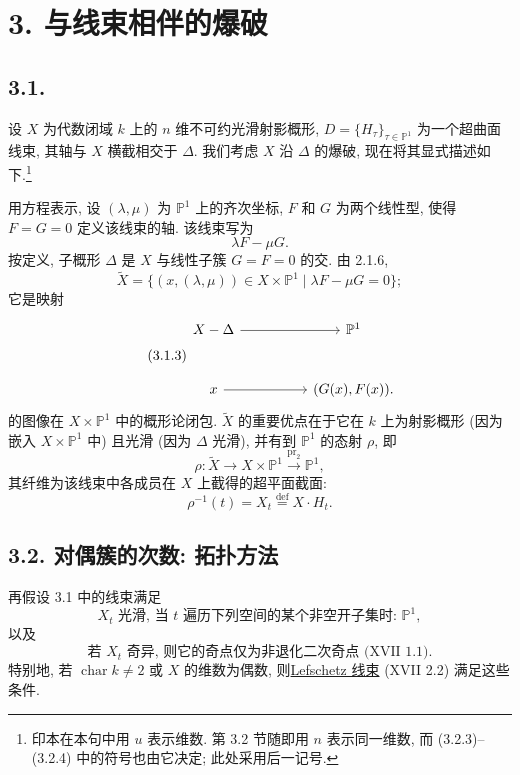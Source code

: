 \section*{3. 与线束相伴的爆破}

\subsection*{3.1.}
设 $X$ 为代数闭域 $k$ 上的 $n$ 维不可约光滑射影概形, $D=\{H_\tau\}_{\tau\in\mathbb P^1}$ 为一个超曲面线束, 其轴与 $X$ 横截相交于 $\Delta$. 我们考虑 $X$ 沿 $\Delta$ 的爆破, 现在将其显式描述如下.\footnote{印本在本句中用 $u$ 表示维数. 第 3.2 节随即用 $n$ 表示同一维数, 而 (3.2.3)--(3.2.4) 中的符号也由它决定; 此处采用后一记号.}

用方程表示, 设 $(\lambda,\mu)$ 为 $\mathbb P^1$ 上的齐次坐标, $F$ 和 $G$ 为两个线性型, 使得 $F=G=0$ 定义该线束的轴. 该线束写为
\begin{equation}\tag{3.1.1}
\lambda F-\mu G.
\end{equation}
按定义, 子概形 $\Delta$ 是 $X$ 与线性子簇 $G=F=0$ 的交. 由 2.1.6,
\begin{equation}\tag{3.1.2}
\widetilde X
=\{(x,(\lambda,\mu))\in X\times\mathbb P^1
       \mid \lambda F-\mu G=0\};
\end{equation}
它是映射
\begin{equation}\tag{3.1.3}
\begin{tikzcd}[row sep=large,column sep=huge]
X-\Delta \arrow[r] & \mathbb P^1 \\
x \arrow[r] & (G(x),F(x)).
\end{tikzcd}
\end{equation}
的图像在 $X\times\mathbb P^1$ 中的概形论闭包. $\widetilde X$ 的重要优点在于它在 $k$ 上为射影概形 (因为嵌入 $X\times\mathbb P^1$ 中) 且光滑 (因为 $\Delta$ 光滑), 并有到 $\mathbb P^1$ 的态射 $\rho$, 即
\begin{equation}\tag{3.1.4}
\rho:\widetilde X\longrightarrow X\times\mathbb P^1
\xrightarrow{\operatorname{pr}_2}\mathbb P^1,
\end{equation}
其纤维为该线束中各成员在 $X$ 上截得的超平面截面:
\[
\rho^{-1}(t)=X_t\overset{\mathrm{def}}{=}X\cdot H_t.
\]

\subsection*{3.2. 对偶簇的次数: 拓扑方法}

再假设 3.1 中的线束满足
\begin{equation}\tag{3.2.1}
X_t\text{ 光滑, 当 }t\text{ 遍历下列空间的某个非空开子集时: }
\mathbb P^1,
\end{equation}
以及
\begin{equation}\tag{3.2.2}
\text{若 $X_t$ 奇异, 则它的奇点仅为非退化二次奇点 (XVII 1.1).}
\end{equation}
特别地, 若 $\operatorname{char}k\ne2$ 或 $X$ 的维数为偶数, 则\underline{Lefschetz 线束} (XVII 2.2) 满足这些条件.

